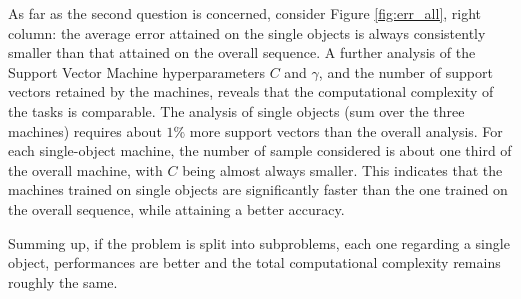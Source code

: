 As far as the second question is concerned, consider Figure
\ref{fig:err_all}, right column: the average error attained on the
single objects is always consistently smaller than that attained on
the overall sequence. A further analysis of the Support Vector Machine
hyperparameters $C$ and $\gamma$, and the number of support vectors
retained by the machines, reveals that the computational complexity of
the tasks is comparable. The analysis of single objects (sum over the
three machines) requires about $1\%$ more support vectors than the
overall analysis. For each single-object machine, the number of sample
considered is about one third of the overall machine, with $C$ being
almost always smaller. This indicates that the machines trained on
single objects are significantly faster than the one trained on the
overall sequence, while attaining a better accuracy.

Summing up, if the problem is split into subproblems, each one
regarding a single object, performances are better and the total
computational complexity remains roughly the same.
